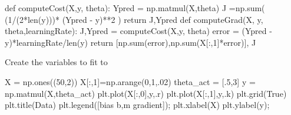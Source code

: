 \documentclass[
  letterpaper,
  DIV=11,
  numbers=noendperiod]{scrartcl}
\newenvironment{Shaded}{\begin{snugshade}}{\end{snugshade}}
\newcommand{\BuiltInTok}[1]{\textcolor[rgb]{0.00,0.23,0.31}{#1}}
\newcommand{\ControlFlowTok}[1]{\textcolor[rgb]{0.00,0.23,0.31}{#1}}
\newcommand{\DecValTok}[1]{\textcolor[rgb]{0.68,0.00,0.00}{#1}}
\newcommand{\FloatTok}[1]{\textcolor[rgb]{0.68,0.00,0.00}{#1}}
\newcommand{\KeywordTok}[1]{\textcolor[rgb]{0.00,0.23,0.31}{#1}}
\newcommand{\NormalTok}[1]{\textcolor[rgb]{0.00,0.23,0.31}{#1}}
\newcommand{\OperatorTok}[1]{\textcolor[rgb]{0.37,0.37,0.37}{#1}}
\newcommand{\StringTok}[1]{\textcolor[rgb]{0.13,0.47,0.30}{#1}}
\newcommand{\VariableTok}[1]{\textcolor[rgb]{0.07,0.07,0.07}{#1}}
\begin{document}
\begin{Shaded}
\begin{Highlighting}[]
\KeywordTok{def}\NormalTok{ computeCost(X,y, theta):}
\NormalTok{    Ypred }\OperatorTok{=}\NormalTok{ np.matmul(X,theta)}
\NormalTok{    J }\OperatorTok{=}\NormalTok{np.}\BuiltInTok{sum}\NormalTok{( (}\DecValTok{1}\OperatorTok{/}\NormalTok{(}\DecValTok{2}\OperatorTok{*}\BuiltInTok{len}\NormalTok{(y)))}\OperatorTok{*}\NormalTok{ (Ypred }\OperatorTok{{-}}\NormalTok{ y)}\OperatorTok{**}\DecValTok{2}\NormalTok{ )}
    \ControlFlowTok{return}\NormalTok{ J,Ypred}
\KeywordTok{def}\NormalTok{ computeGrad(X, y, theta,learningRate):}
\NormalTok{    J,Ypred }\OperatorTok{=}\NormalTok{ computeCost(X,y, theta)}
\NormalTok{    error }\OperatorTok{=}\NormalTok{ (Ypred }\OperatorTok{{-}}\NormalTok{ y)}\OperatorTok{*}\NormalTok{learningRate}\OperatorTok{/}\BuiltInTok{len}\NormalTok{(y)}
    \ControlFlowTok{return}\NormalTok{ [np.}\BuiltInTok{sum}\NormalTok{(error),np.}\BuiltInTok{sum}\NormalTok{(X[:,}\DecValTok{1}\NormalTok{]}\OperatorTok{*}\NormalTok{error)], J}
    
\end{Highlighting}
\end{Shaded}

Create the variables to fit to

\begin{Shaded}
\begin{Highlighting}[]
\NormalTok{X }\OperatorTok{=}\NormalTok{ np.ones((}\DecValTok{50}\NormalTok{,}\DecValTok{2}\NormalTok{))}
\NormalTok{X[:,}\DecValTok{1}\NormalTok{]}\OperatorTok{=}\NormalTok{np.arange(}\DecValTok{0}\NormalTok{,}\DecValTok{1}\NormalTok{,}\FloatTok{.02}\NormalTok{)}
\NormalTok{theta\_act }\OperatorTok{=}\NormalTok{ [}\FloatTok{.5}\NormalTok{,}\DecValTok{3}\NormalTok{]}
\NormalTok{y }\OperatorTok{=}\NormalTok{ np.matmul(X,theta\_act)}
\NormalTok{plt.plot(X[:,}\DecValTok{0}\NormalTok{],y,}\StringTok{\textquotesingle{}.r\textquotesingle{}}\NormalTok{)}
\NormalTok{plt.plot(X[:,}\DecValTok{1}\NormalTok{],y,}\StringTok{\textquotesingle{}.k\textquotesingle{}}\NormalTok{)}
\NormalTok{plt.grid(}\VariableTok{True}\NormalTok{)}
\NormalTok{plt.title(}\StringTok{\textquotesingle{}Data\textquotesingle{}}\NormalTok{)}
\NormalTok{plt.legend([}\StringTok{\textquotesingle{}bias b\textquotesingle{}}\NormalTok{,}\StringTok{\textquotesingle{}m gradient\textquotesingle{}}\NormalTok{])}\OperatorTok{;}
\NormalTok{plt.xlabel(}\StringTok{\textquotesingle{}X\textquotesingle{}}\NormalTok{)}
\NormalTok{plt.ylabel(}\StringTok{\textquotesingle{}y\textquotesingle{}}\NormalTok{)}\OperatorTok{;}
\end{Highlighting}
\end{Shaded}
\end{document}
